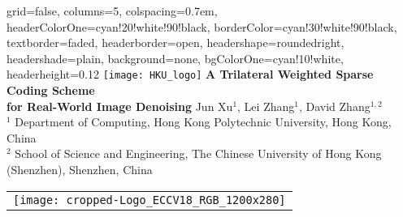 \documentclass[landscape,a0paper,fontscale=0.292]{baposter}
\begin{document}
\begin{poster}{
 grid=false,
 columns=5,
 colspacing=0.7em,
 headerColorOne=cyan!20!white!90!black,
 borderColor=cyan!30!white!90!black,
 textborder=faded,
 headerborder=open,
 headershape=roundedright,
 headershade=plain,
 background=none,
 bgColorOne=cyan!10!white,
 headerheight=0.12\textheight}
 {
      \texttt{[image: HKU\_logo]}
      \makebox[0.01\textwidth]{} 
      \makebox[0.04\textwidth]{} 
 }
 {\sc\huge\bf A Trilateral Weighted Sparse Coding Scheme \\ for Real-World Image Denoising}
 {
 \vspace{0.3em} Jun Xu$^1$, Lei Zhang$^1$, David Zhang$^{1,2}$ \\[0.2em]
 {
 $^1$ Department of Computing, Hong Kong Polytechnic University, Hong Kong, China
 \\
 $^2$ School of Science and Engineering, The Chinese University of Hong Kong (Shenzhen), Shenzhen, China
 \\[0.2em] 
 }
 }
 {
    \begin{tabular}{r}
        \texttt{[image: cropped-Logo\_ECCV18\_RGB\_1200x280]}
    \end{tabular}
 }

\end{poster}
\end{document}
